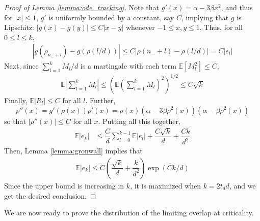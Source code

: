 \documentclass[12pt]{article}
\newtheorem{theorem}{Theorem}[section]  %
\def\gN{{\mathcal{N}}}
\newcommand{\E}{\mathbb{E}}
\begin{document}
\begin{proof}[Proof of Lemma \ref{lemma:ode_tracking}]
    Note that $g'(x)=\alpha - 3\beta x^2$, and thus for $|x|\leq 1$, $g'$ is uniformly bounded by a constant, say $C$, implying that $g$ is Lipschitz: $|g(x)-g(y)|\leq C|x-y|$ whenever $-1\leq x,y\leq 1$. Thus, for all $0\leq l\leq k$,
    \begin{align*}
        |g(\rho_{n_-+l})-g(\rho(l/d))| \leq C|\rho(n_-+l)-\rho(l/d)| = C|e_l|
    \end{align*}
    Next, since $\sum_{l=1}^k M_l/d$ is a martingale with each term $\E[M_l^2]\leq C$,
    \begin{align*}
        \E\left|\sum_{l=1}^k M_l\right| \leq \left(\E\left(\sum_{l=1}^k M_l\right)^2\right)^{1/2} \leq C\sqrt{k}
    \end{align*}Finally, $\E|R_l|\leq C$ for all $l$. Further, $$\rho''(x)=g'(\rho(x))\rho'(x)=\rho(x)(\alpha-3\beta \rho^2(x))(\alpha - \beta \rho^2(x))$$so that $|\rho''(x)|\leq C$ for all $x$. Putting all this together,
    \begin{align*}
        \E|e_k| &\leq \dfrac{C}{d}\sum_{l=0}^{k-1}\E|e_l| + \dfrac{C\sqrt{k}}{d} + \dfrac{Ck}{d^2}
    \end{align*}Then, Lemma \ref{lemma:gronwall} implies that
    \begin{align*}
        \E|e_k|\leq C\left(\dfrac{\sqrt{k}}{d}+\dfrac{k}{d^2}\right)\exp(Ck/d)
    \end{align*}Since the upper bound is increasing in $k$, it is maximized when $k=2t_d d$, and we get the desired conclusion.
\end{proof}


\medskip

We are now ready to prove the distribution of the limiting overlap at criticality.

\medskip
\end{document}
